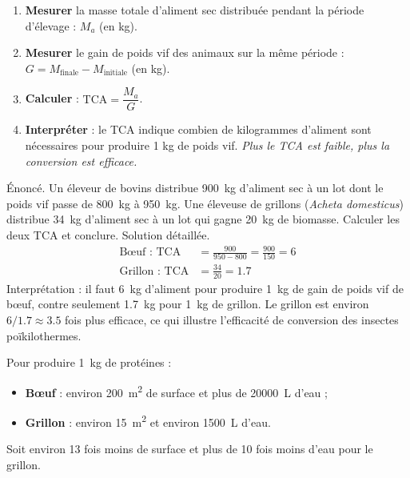 \documentclass[11pt]{article}
\begin{document}
\begin{methode}
\begin{enumerate}
\item \textbf{Mesurer} la masse totale d'aliment sec distribuée pendant la période d'élevage : $M_a$ (en kg).
\item \textbf{Mesurer} le gain de poids vif des animaux sur la même période : $G = M_{\text{finale}} - M_{\text{initiale}}$ (en kg).
\item \textbf{Calculer} : $\mathrm{TCA} = \dfrac{M_a}{G}$.
\item \textbf{Interpréter} : le TCA indique combien de kilogrammes d'aliment sont nécessaires pour produire 1 kg de poids vif. \emph{Plus le TCA est faible, plus la conversion est efficace.}
\end{enumerate}
\end{methode}

\begin{exoresolu}
Énoncé. Un éleveur de bovins distribue \SI{900}{kg} d'aliment sec à un lot dont le poids vif passe de \SI{800}{kg} à \SI{950}{kg}. Une éleveuse de grillons (\emph{Acheta domesticus}) distribue \SI{34}{kg} d'aliment sec à un lot qui gagne \SI{20}{kg} de biomasse. Calculer les deux TCA et conclure.
\tcblower
Solution détaillée.
\begin{align*}
\text{Bœuf : } \mathrm{TCA} &= \frac{900}{950-800} = \frac{900}{150} = 6 \\
\text{Grillon : } \mathrm{TCA} &= \frac{34}{20} = \num{1,7}
\end{align*}
Interprétation : il faut \SI{6}{kg} d'aliment pour produire \SI{1}{kg} de gain de poids vif de bœuf, contre seulement \SI{1,7}{kg} pour \SI{1}{kg} de grillon. Le grillon est environ $6/\num{1,7} \approx \num{3,5}$ fois plus efficace, ce qui illustre l'efficacité de conversion des insectes poïkilothermes.
\end{exoresolu}

\begin{exemplebox}
Pour produire \SI{1}{kg} de protéines :
\begin{itemize}
\item \textbf{Bœuf} : environ \SI{200}{m^2} de surface et plus de \SI{20000}{L} d'eau ;
\item \textbf{Grillon} : environ \SI{15}{m^2} et environ \SI{1500}{L} d'eau.
\end{itemize}
Soit environ 13 fois moins de surface et plus de 10 fois moins d'eau pour le grillon.
\end{exemplebox}
\end{document}

